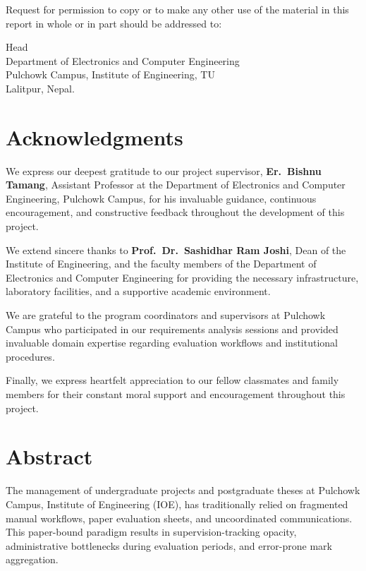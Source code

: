 \documentclass[12pt]{report}
\begin{document}
Request for permission to copy or to make any other use of the material in this report
in whole or in part should be addressed to:

\vspace{0.8cm}
Head\\
Department of Electronics and Computer Engineering\\
Pulchowk Campus, Institute of Engineering, TU\\
Lalitpur, Nepal.

\chapter*{Acknowledgments}

We express our deepest gratitude to our project supervisor, \textbf{Er.\ Bishnu
Tamang}, Assistant Professor at the Department of Electronics and Computer Engineering,
Pulchowk Campus, for his invaluable guidance, continuous encouragement, and
constructive feedback throughout the development of this project.

We extend sincere thanks to \textbf{Prof.\ Dr.\ Sashidhar Ram Joshi}, Dean of the
Institute of Engineering, and the faculty members of the Department of Electronics and
Computer Engineering for providing the necessary infrastructure, laboratory facilities,
and a supportive academic environment.

We are grateful to the program coordinators and supervisors at Pulchowk Campus who
participated in our requirements analysis sessions and provided invaluable domain
expertise regarding evaluation workflows and institutional procedures.

Finally, we express heartfelt appreciation to our fellow classmates and family members
for their constant moral support and encouragement throughout this project.

\chapter*{Abstract}

The management of undergraduate projects and postgraduate theses at Pulchowk Campus,
Institute of Engineering (IOE), has traditionally relied on fragmented manual
workflows, paper evaluation sheets, and uncoordinated communications. This paper-bound
paradigm results in supervision-tracking opacity, administrative bottlenecks during
evaluation periods, and error-prone mark aggregation.
\end{document}
